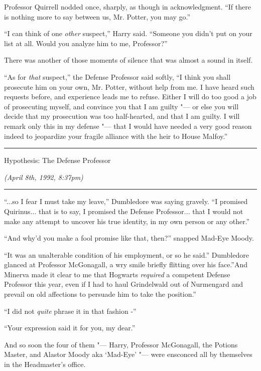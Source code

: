 Professor Quirrell nodded once, sharply, as though in acknowledgment.
``If there is nothing more to say between us, Mr. Potter, you may go.''

``I can think of one \emph{other} suspect,'' Harry said. ``Someone you
didn't put on your list at all. Would you analyze him to me,
Professor?''

There was another of those moments of silence that was almost a sound in
itself.

``As for \emph{that} suspect,'' the Defense Professor said softly, ``I
think you shall prosecute him on your own, Mr. Potter, without help from
me. I have heard such requests before, and experience leads me to
refuse. Either I will do too good a job of prosecuting myself, and
convince you that I am guilty "--- or else you will decide that my
prosecution was too half-hearted, and that I am guilty. I will remark
only this in my defense "--- that I would have needed a very good reason
indeed to jeopardize your fragile alliance with the heir to House
Malfoy.''

\begin{center}\rule{3in}{0.4pt}\end{center}

Hypothesis: The Defense Professor

\emph{(April 8th, 1992, 8:37pm)}

\begin{center}\rule{3in}{0.4pt}\end{center}

``...so I fear I must take my leave,'' Dumbledore was saying
gravely. ``I promised Quirinus... that is to say, I promised the
Defense Professor... that I would not make any attempt to uncover
his true identity, in my own person or any other.''

``And why'd you make a fool promise like that, then?'' snapped Mad-Eye
Moody.

``It was an unalterable condition of his employment, or so he said.''
Dumbledore glanced at Professor McGonagall, a wry smile briefly flitting
over his face.''And Minerva made it clear to me that Hogwarts
\emph{required} a competent Defense Professor this year, even if I had
to haul Grindelwald out of Nurmengard and prevail on old affections to
persuade him to take the position.''

``I did not \emph{quite} phrase it in that fashion -''

``Your expression said it for you, my dear.''

And so soon the four of them "--- Harry, Professor McGonagall, the Potions
Master, and Alastor Moody aka `Mad-Eye' "--- were ensconced all by
themselves in the Headmaster's office.

